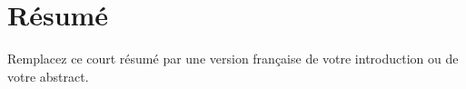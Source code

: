 \chapter*{R\'esum\'e}

\begin{otherlanguage}{french}
Remplacez ce court r\'esum\'e par une version fran\c{c}aise de votre introduction ou de votre abstract.
\end{otherlanguage}
